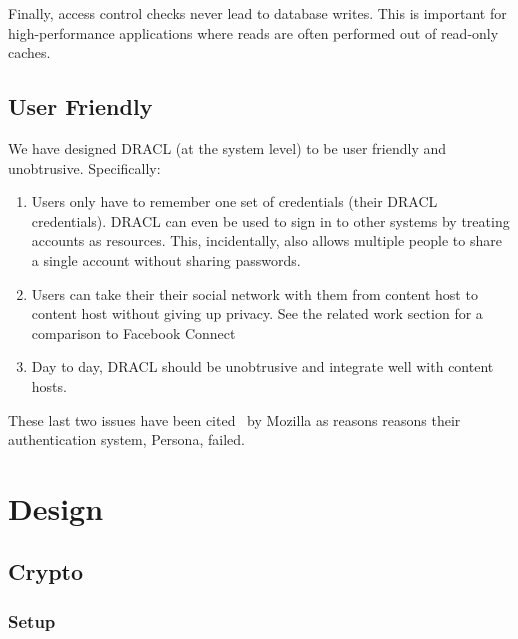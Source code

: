 \documentclass[pdftex,12pt,a4papaer]{report}
\begin{document}
Finally, access control checks never lead to database writes. This is important
for high-performance applications where reads are often performed out of
read-only caches.

\section{User Friendly}

We have designed DRACL (at the system level) to be user friendly and
unobtrusive. Specifically:

\begin{enumerate}
  \item Users only have to remember one set of credentials (their DRACL
    credentials). DRACL can even be used to sign in to other systems by treating
    accounts as resources. This, incidentally, also allows multiple people to share
    a single account without sharing passwords.
  \item Users can take their their social network with them from content host to
    content host without giving up privacy. See the related work section for a
    comparison to Facebook Connect\texttrademark~\cite{facebook-connect}
  \item Day to day, DRACL should be unobtrusive and integrate well with content
    hosts.
\end{enumerate}

These last two issues have been cited~\cite{persona-fail} by Mozilla as reasons
reasons their authentication system, Persona, failed.

\chapter{Design}

\section{Crypto}

\subsection{Setup}
\end{document}
